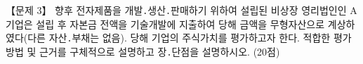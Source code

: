 \begin{longquestion}{【문제 3】}
향후 전자제품을 개발․생산․판매하기 위하여 설립된 비상장 영리법인인 A기업은 설립 후 자본금 전액을 기술개발에 지출하여 당해 금액을 무형자산으로 계상하였다(다른 자산․부채는 없음). 당해 기업의 주식가치를 평가하고자 한다. 적합한 평가방법 및 근거를 구체적으로 설명하고 장․단점을 설명하시오. (20점) \par
\end{longquestion}
